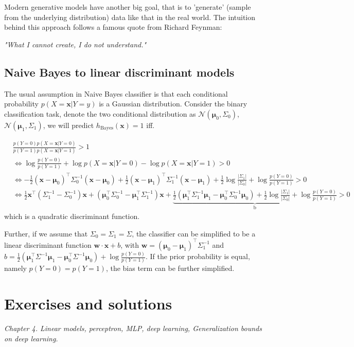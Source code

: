 \documentclass{article}
\begin{document}
	Modern generative models have another big goal, that is to 'generate' (sample from the underlying distribution) data like that in the real world. The intuition behind this approach follows a famous quote from Richard Feynman:	
	\begin{center}
	\textit{"What I cannot create, I do not understand."}
	\end{center}

	\subsection{Naive Bayes to linear discriminant models}
	The usual assumption in Naive Bayes classifier is that each conditional probability $p(X=\mathbf{x}|Y=y)$ is a Gaussian distribution. Consider the binary classification task, denote the two conditional distribution as $\mathcal{N}(\mathbf{\mu}_0,\Sigma_0)$, $\mathcal{N}(\mathbf{\mu}_1,\Sigma_1)$, we will predict $h_{\mathrm{Bayes}}(\mathbf{x})=1$ iff.
	
	\begin{equation*}
	\begin{split}
	&\frac{p(Y=0) p(X=\mathbf{x}|Y=0)}{p(Y=1) p(X=\mathbf{x}|Y=1)} > 1 \\
	&\iff \log \frac{p(Y=0)}{p(Y=1)} + \log p(X=\mathbf{x}|Y=0) - \log p(X=\mathbf{x}|Y=1) > 0 \\
	&\iff -\frac{1}{2}(\mathbf{x}-\mathbf{\mu}_0)^\top \Sigma_0^{-1}(\mathbf{x}-\mathbf{\mu}_0) + \frac{1}{2}(\mathbf{x}-\mathbf{\mu}_1)^\top \Sigma_1^{-1}(\mathbf{x}-\mathbf{\mu}_1) +  \frac{1}{2}\log\frac{|\Sigma_1|}{|\Sigma_0|} + \log \frac{p(Y=0)}{p(Y=1)} > 0 \\
	&\iff \frac{1}{2} \mathbf{x}^\top ( \Sigma_1^{-1} - \Sigma_0^{-1}) \mathbf{x} + (\mathbf{\mu}_0^\top\Sigma_0^{-1} - \mathbf{\mu}_1^\top\Sigma_1^{-1}) \mathbf{x} + \underbrace{\frac{1}{2} (\mathbf{\mu}_1^\top\Sigma_1^{-1}\mathbf{\mu}_1 - \mathbf{\mu}_0^\top\Sigma_0^{-1}\mathbf{\mu}_0 ) + \frac{1}{2}\log\frac{|\Sigma_1|}{|\Sigma_0|} + \log \frac{p(Y=0)}{p(Y=1)}}_{\mathrm{b}} > 0
	\end{split}
	\end{equation*}
which is a quadratic discriminant function.

	Further, if we assume that $\Sigma_0=\Sigma_1=\Sigma$, the classifier can be simplified to be a linear discriminant function $\mathbf{w}\cdot\mathbf{x}+b$, with $\mathbf{w}=(\mathbf{\mu}_0 - \mathbf{\mu}_1)^\top\Sigma_1^{-1}$ and $b=\frac{1}{2} (\mathbf{\mu}_1^\top\Sigma^{-1}\mathbf{\mu}_1 - \mathbf{\mu}_0^\top\Sigma^{-1}\mathbf{\mu}_0 ) + \log \frac{p(Y=0)}{p(Y=1)}$. If the prior probability is equal, namely $p(Y=0)=p(Y=1)$, the bias term can be further simplified.
	
	
	
	
\section{Exercises and solutions}

\textit{
      Chapter 4. Linear models, perceptron, MLP, deep learning, Generalization bounds on deep learning.}
\end{document}
